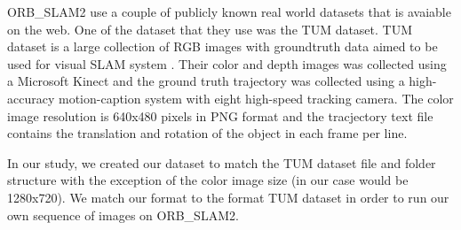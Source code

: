 ORB\_SLAM2 use a couple of publicly known real world datasets that is avaiable on the web. One of the dataset that they use was the TUM dataset. TUM dataset is a large collection of RGB images with groundtruth data aimed to be used for visual SLAM system \cite{sturm12iros}. Their color and depth images was collected using a Microsoft Kinect and the ground truth trajectory was collected using a high-accuracy motion-caption system with eight high-speed tracking camera. The color image resolution is 640x480 pixels in PNG format and the tracjectory text file contains the translation and rotation of the object in each frame per line\cite{sturm12iros}. 

In our study, we created our dataset to match the TUM dataset file and folder structure with the exception of the color image size (in our case would be 1280x720). We match our format to the format TUM dataset in order to run our own sequence of images on ORB\_SLAM2. 